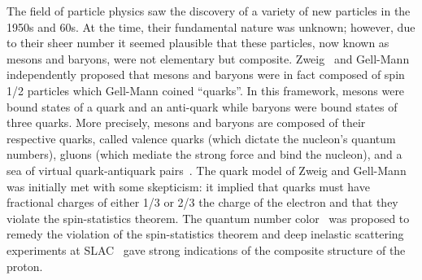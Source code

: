 The field of particle physics saw the discovery of a variety of new particles in the 1950s and 60s.
At the time, their fundamental nature was unknown; however, due to their sheer number it seemed plausible that these particles, now known as mesons and baryons, were not elementary but composite.
Zweig~\cite{Zweig:1964jf} and Gell-Mann~\cite{GellMann:1964nj} independently proposed that mesons and baryons were in fact composed of spin 1/2 particles which Gell-Mann coined ``quarks''.
In this framework, mesons were bound states of a quark and an anti-quark while baryons were bound states of three quarks. More precisely, mesons and baryons are composed of their respective quarks, called valence quarks (which dictate the nucleon's quantum numbers), gluons (which mediate the strong force and bind the nucleon), and a sea of virtual quark-antiquark pairs~\cite{Yan:2015zoa}. 
The quark model of Zweig and Gell-Mann was initially met with some skepticism: it implied that quarks must have fractional charges of either 1/3 or 2/3 the charge of the electron and that they violate the spin-statistics theorem.
The quantum number color~\cite{Greenberg:1964pe} was proposed to remedy the violation of the spin-statistics theorem and deep inelastic scattering experiments at SLAC~\cite{Breidenbach:1969kd,Bloom:1969kc} gave strong indications of the composite structure of the proton.

